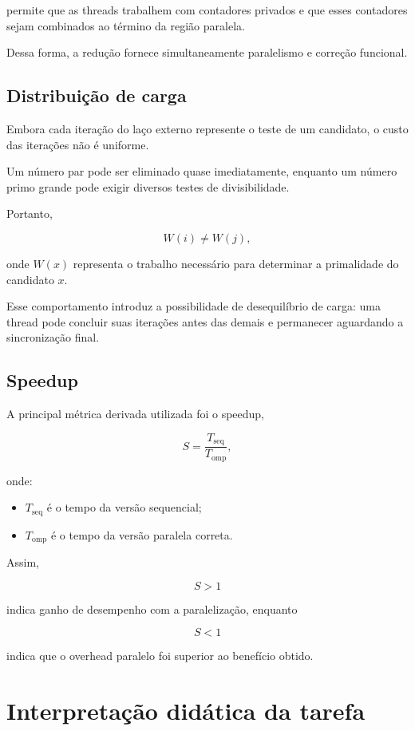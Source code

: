 permite que as threads trabalhem com contadores privados e que esses
contadores sejam combinados ao término da região paralela.

Dessa forma, a redução fornece simultaneamente paralelismo e correção
funcional.


\subsection{Distribuição de carga}

Embora cada iteração do laço externo represente o teste de um candidato,
o custo das iterações não é uniforme.

Um número par pode ser eliminado quase imediatamente, enquanto um número
primo grande pode exigir diversos testes de divisibilidade.

Portanto,

\[
W(i) \neq W(j),
\]

onde \(W(x)\) representa o trabalho necessário para determinar a
primalidade do candidato \(x\).

Esse comportamento introduz a possibilidade de desequilíbrio de carga:
uma thread pode concluir suas iterações antes das demais e permanecer
aguardando a sincronização final.


\subsection{Speedup}

A principal métrica derivada utilizada foi o speedup,

\[
S =
\frac{T_{\mathrm{seq}}}
     {T_{\mathrm{omp}}},
\]

onde:

\begin{itemize}
    \item \(T_{\mathrm{seq}}\) é o tempo da versão sequencial;
    \item \(T_{\mathrm{omp}}\) é o tempo da versão paralela correta.
\end{itemize}

Assim,

\[
S > 1
\]

indica ganho de desempenho com a paralelização, enquanto

\[
S < 1
\]

indica que o overhead paralelo foi superior ao benefício obtido.


\section{Interpretação didática da tarefa}
\label{sec:atvd05-interpretacao}

